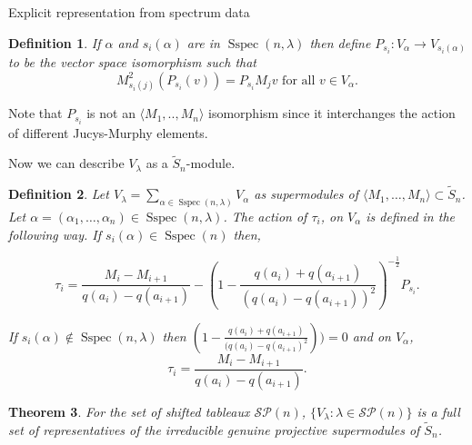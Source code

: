 \documentclass[a4paper,10pt]{amsart}
\newtheorem{theorem}{Theorem}[section]
\newtheorem{definition}[theorem]{Definition}
\DeclareMathOperator{\Sspec}{Sspec}
\begin{document}
\begin{section}{Explicit representation from spectrum data}
\begin{definition} If $\alpha$ and $s_i(\alpha)$ are in $\Sspec(n,\lambda)$ then define $P_{s_i}:V_\alpha \to V_{s_i(\alpha)}$ to be the vector space isomorphism such that 
$$M_{s_i(j)}^2 (P_{s_i} (v)) = P_{s_i} M_j v \text{ for all } v \in V_\alpha.$$ 
 \end{definition} 
 Note that $P_{s_i}$ is not an $\langle M_1,..,M_n\rangle$ isomorphism since it interchanges the action of different Jucys-Murphy elements. 


Now we can describe $V_\lambda$ as a $\tilde{S}_n$-module.
\begin{definition}\label{actionoftau} %
Let $V_\lambda =    \sum_{\alpha \in \Sspec(n, \lambda)} V_\alpha$ as supermodules of $\langle M_1,\ldots ,M_n\rangle \subset \tilde{S}_n$.  Let $\alpha = (\alpha_1,\ldots ,\alpha_n) \in \Sspec(n, \lambda)$. The action of $\tau_i$, on $V_\alpha$ is defined in the following way. If $s_i(\alpha) \in \Sspec(n)$ then,

 $$\tau_i = \frac{M_i - M_{i+1}}{q(a_i) -q(a_{i+1})}- \left(1 - \frac{q(a_i) +q(a_{i+1})}{(q(a_i) - q(a_{i+1}))^2}\right)^{-\frac{1}{2}} P_{s_i} .$$
 
If $s_i(\alpha ) \notin \Sspec(n, \lambda)$ then $(1 - \frac{q(a_i) +q(a_{i+1})}{(q(a_i) - q(a_{i+1})^2}))= 0$
 and on $V_\alpha$,
 $$\tau_i = \frac{M_i - M_{i+1}}{q(a_i) -q(a_{i+1})}.$$
 \end{definition}
 
\begin{theorem}  For the set of shifted tableaux $\mathcal{SP}(n)$, $\{V_\lambda: \lambda \in \mathcal{SP}(n)\}$ is a full set of representatives of the irreducible genuine projective supermodules of $\tilde{S}_n$. 
 \end{theorem}
 

\end{section}
\end{document}
